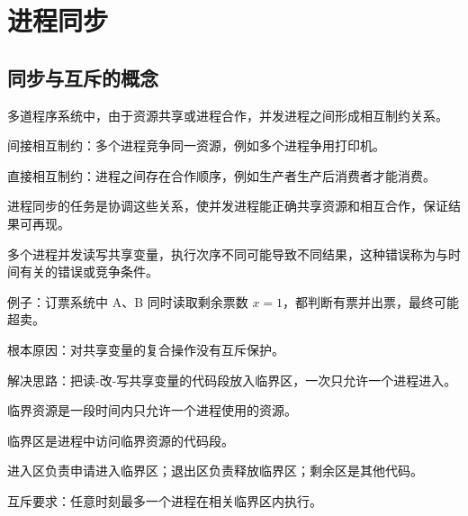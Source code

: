 \chapter{进程同步}

\section{同步与互斥的概念}
\begin{points}
  \item 多道程序系统中，由于资源共享或进程合作，并发进程之间形成相互制约关系。
  \item 间接相互制约：多个进程竞争同一资源，例如多个进程争用打印机。
  \item 直接相互制约：进程之间存在合作顺序，例如生产者生产后消费者才能消费。
  \item 进程同步的任务是协调这些关系，使并发进程能正确共享资源和相互合作，保证结果可再现。
\end{points}


\begin{points}
  \item 多个进程并发读写共享变量，执行次序不同可能导致不同结果，这种错误称为与时间有关的错误或竞争条件。
  \item 例子：订票系统中 A、B 同时读取剩余票数 $x=1$，都判断有票并出票，最终可能超卖。
  \item 根本原因：对共享变量的复合操作没有互斥保护。
  \item 解决思路：把读-改-写共享变量的代码段放入临界区，一次只允许一个进程进入。
\end{points}


\begin{points}
  \item 临界资源是一段时间内只允许一个进程使用的资源。
  \item 临界区是进程中访问临界资源的代码段。
  \item 进入区负责申请进入临界区；退出区负责释放临界区；剩余区是其他代码。
  \item 互斥要求：任意时刻最多一个进程在相关临界区内执行。
\end{points}


